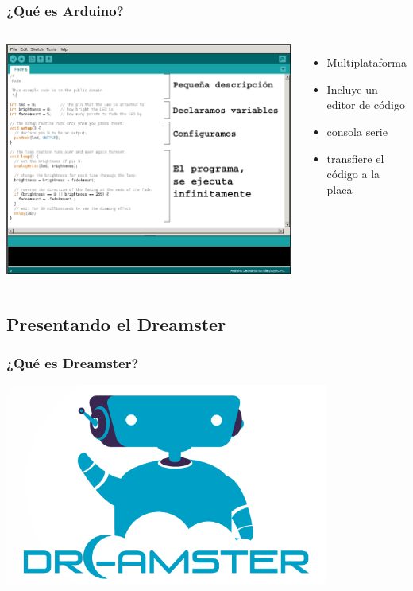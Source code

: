 \documentclass[compress]{beamer}
\begin{document}
\begin{frame}
 \frametitle{¿Qué es Arduino?}
\begin{columns}
  \includegraphics[width=\columnwidth]{./img/arduino-ide-text.png}
  \begin{itemize}
   \item Multiplataforma
   \item Incluye un editor de código
   \item consola serie
   \item transfiere el código a la placa
  \end{itemize}

\end{columns}

\end{frame}

\subsection{Presentando el Dreamster}
\begin{frame}
 \frametitle{¿Qué es Dreamster?}
 \begin{center}
 \includegraphics[width=0.8\textwidth]{./img/dreamster_logo.png}
 \vspace{0.5cm}
 
 \end{center}
\end{frame}
\end{document}
